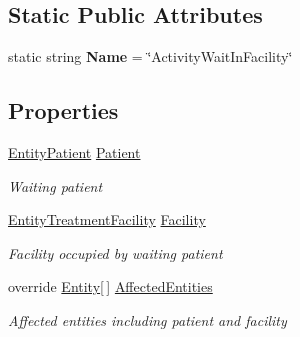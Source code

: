 \subsection*{Static Public Attributes}
\begin{DoxyCompactItemize}
\item 
static string {\bfseries Name} = \char`\"{}Activity\+Wait\+In\+Facility\char`\"{}\hypertarget{class_general_health_care_elements_1_1_activities_1_1_activity_wait_in_facility_abf77f1fe4c8a47acb90d1f9ab57b96ba}{}\label{class_general_health_care_elements_1_1_activities_1_1_activity_wait_in_facility_abf77f1fe4c8a47acb90d1f9ab57b96ba}

\end{DoxyCompactItemize}
\subsection*{Properties}
\begin{DoxyCompactItemize}
\item 
\hyperlink{class_general_health_care_elements_1_1_entities_1_1_entity_patient}{Entity\+Patient} \hyperlink{class_general_health_care_elements_1_1_activities_1_1_activity_wait_in_facility_a4e6d840e85d112849667e92066eff0d1}{Patient}
\begin{DoxyCompactList}\small\item\em Waiting patient \end{DoxyCompactList}\item 
\hyperlink{class_general_health_care_elements_1_1_entities_1_1_entity_treatment_facility}{Entity\+Treatment\+Facility} \hyperlink{class_general_health_care_elements_1_1_activities_1_1_activity_wait_in_facility_ade2d3e1d246d1c9fb6f99b926e5b8370}{Facility}
\begin{DoxyCompactList}\small\item\em Facility occupied by waiting patient \end{DoxyCompactList}\item 
override \hyperlink{class_simulation_core_1_1_h_c_c_m_elements_1_1_entity}{Entity}\mbox{[}$\,$\mbox{]} \hyperlink{class_general_health_care_elements_1_1_activities_1_1_activity_wait_in_facility_aa288e6b5df7f3d67e5357c1da1173e5b}{Affected\+Entities}
\begin{DoxyCompactList}\small\item\em Affected entities including patient and facility \end{DoxyCompactList}\end{DoxyCompactItemize}


